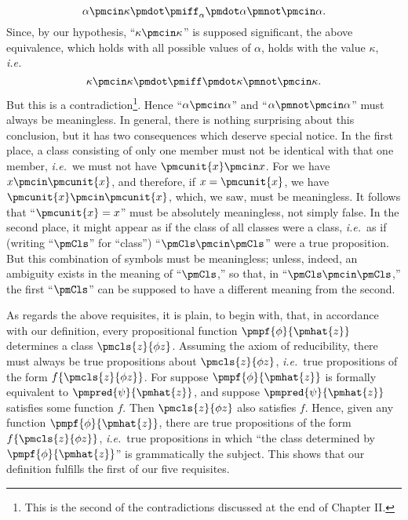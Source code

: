 \documentclass[letterpaper,12pt,openany,leqno]{book}
\newcommand{\pagefirst}[1]{\marginnote[\boxed{\text{#1}}]{\boxed{\text{#1}}}}
\begin{document}
\[
	\alpha \pmcin \kappa \pmdot \pmiff_\alpha \pmdot \alpha \pmnot \pmcin \alpha.
\]
Since, by our hypothesis, ``$\kappa \pmcin \kappa$'' is supposed significant, the above equivalence, which holds with all possible values of $\alpha$, holds with the value $\kappa$, \textit{i.e.}\
\[
	\kappa \pmcin \kappa \pmdot \pmiff \pmdot \kappa \pmnot \pmcin \kappa.
\]
\pagefirst{81} But this is a contradiction\footnote{This is the second of the contradictions discussed at the end of Chapter II.}. Hence ``$\alpha \pmcin \alpha$'' and ``$\alpha \pmnot \pmcin \alpha$'' must always be meaningless. In general, there is nothing surprising about this conclusion, but it has two consequences which deserve special notice. In the first place, a class consisting of only one member must not be identical with that one member, \textit{i.e.}\ we must not have $\pmcunit{x} \pmcin x$. For we have $x \pmcin \pmcunit{x}$, and therefore, if $x = \pmcunit{x}$, we have $\pmcunit{x} \pmcin \pmcunit{x}$, which, we saw, must be meaningless. It follows that ``$\pmcunit{x} = x$'' must be absolutely meaningless, not simply false. In the second place, it might appear as if the class of all classes were a class, \textit{i.e.}\ as if (writing ``$\pmCls$'' for ``class'') ``$\pmCls\pmcin\pmCls$'' were a true proposition. But this combination of symbols must be meaningless; unless, indeed, an ambiguity exists in the meaning of ``$\pmCls$,'' so that, in ``$\pmCls \pmcin \pmCls$,'' the first ``$\pmCls$'' can be supposed to have a different meaning from the second.

As regards the above requisites, it is plain, to begin with, that, in accordance with our definition, every propositional function $\pmpf{\phi}{\pmhat{z}}$ determines a class $\pmcls{z}{\phi z}$. Assuming the axiom of reducibility, there must always be true propositions about $\pmcls{z}{\phi z}$, \textit{i.e.}\ true propositions of the form $f\{\pmcls{z}{\phi z}\}$. For suppose $\pmpf{\phi}{\pmhat{z}}$ is formally equivalent to $\pmpred{\psi}{\pmhat{z}}$, and suppose $\pmpred{\psi}{\pmhat{z}}$ satisfies some function $f$. Then $\pmcls{z}{\phi z}$ also satisfies $f$. Hence, given any function $\pmpf{\phi}{\pmhat{z}}$, there are true propositions of the form $f\{\pmcls{z}{\phi z}\}$, \textit{i.e.}\ true propositions in which ``the class determined by $\pmpf{\phi}{\pmhat{z}}$'' is grammatically the subject. This shows that our definition fulfills the first of our five requisites. 
\end{document}
